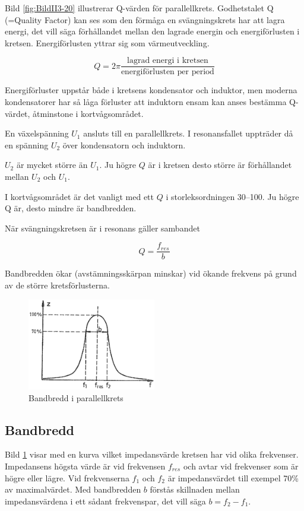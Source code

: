 Bild \ref{fig:BildII3-20} illustrerar Q-värden för parallellkrets.
Godhetstalet Q (=Quality Factor) kan ses som den förmåga en svängningskrets har
att lagra energi, det vill säga förhållandet mellan den lagrade energin och
energiförlusten i kretsen.
Energiförlusten yttrar sig som värmeutveckling.

\[
Q = 2\pi \frac{\text{lagrad energi i kretsen}}{\text{energiförlusten per period}}
\]

Energiförluster uppstår både i kretsens kondensator och induktor, men moderna
kondensatorer har så låga förluster att induktorn ensam kan anses bestämma
Q-värdet, åtminstone i kortvågsområdet.

En växelspänning \(U_1\) ansluts till en parallellkrets.
I resonansfallet uppträder då en spänning \(U_2\) över kondensatorn och
induktorn.

\(U_2\) är mycket större än \(U_1\).
Ju högre \(Q\) är i kretsen desto större är förhållandet mellan \(U_2\) och
\(U_1\).

I kortvågsområdet är det vanligt med ett \(Q\) i storleksordningen 30--100.
Ju högre Q är, desto mindre är bandbredden.

När svängningskretsen är i resonans gäller sambandet

\[Q = \frac{f_{res}}{b}\]

Bandbredden ökar (avstämningsskärpan minskar) vid ökande frekvens på grund av de
större kretsförlusterna.

\begin{figure}
\includegraphics[width=0.5\textwidth]{images/cropped_pdfs/bild_2_3-21.pdf}
\caption{Bandbredd i parallellkrets}
\label{fig:BildII3-21}
\end{figure}

\subsection{Bandbredd}

Bild \ref{fig:BildII3-21} visar med en kurva vilket impedansvärde kretsen har
vid olika frekvenser.
Impedansens högsta värde är vid frekvensen \(f_{res}\) och avtar vid frekvenser
som är högre eller lägre.
Vid frekvenserna \(f_1\) och \(f_2\) är impedansvärdet till exempel 70\% av
maximalvärdet.
Med bandbredden \(b\) förstås skillnaden mellan impedansvärdena i ett sådant
frekvenspar, det vill säga \(b = f_2 - f_1\).
